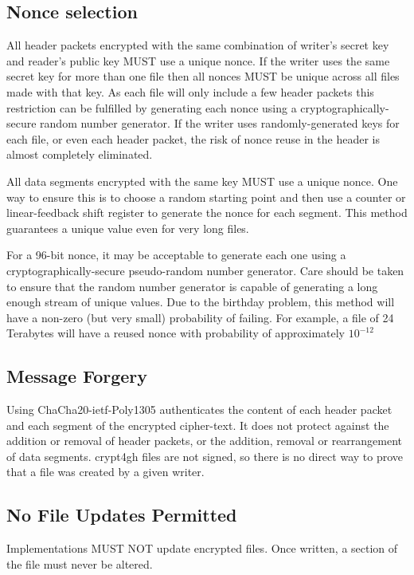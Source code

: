 \documentclass[10pt]{article}
\begin{document}
\subsection{Nonce selection}
All header packets encrypted with the same combination of writer's secret key and reader's public key MUST use a unique
nonce.
If the writer uses the same secret key for more than one file then all nonces MUST be unique across all files made
with that key.
As each file will only include a few header packets this restriction can be fulfilled by generating each nonce
using a cryptographically-secure random number generator.
If the writer uses randomly-generated keys for each file, or even each header packet, the risk of nonce reuse in
the header is almost completely eliminated.

All data segments encrypted with the same key MUST use a unique nonce.
One way to ensure this is to choose a random starting point and then use a counter or linear-feedback shift
register to generate the nonce for each segment.
This method guarantees a unique value even for very long files.

For a 96-bit nonce, it may be acceptable to generate each one using a cryptographically-secure pseudo-random number
generator.
Care should be taken to ensure that the random number generator is capable of generating a long enough stream
of unique values.
Due to the birthday problem, this method will have a non-zero (but very small) probability of failing.
For example, a file of 24 Terabytes will have a reused nonce with probability of approximately $10^{-12}$

\subsection{Message Forgery}
Using ChaCha20-ietf-Poly1305 authenticates the content of each header packet and each segment of the encrypted
cipher-text.
It does not protect against the addition or removal of header packets, or the addition, removal or rearrangement
of data segments.
crypt4gh files are not signed, so there is no direct way to prove that a file was created by a given writer.

\subsection{No File Updates Permitted}
Implementations MUST NOT update encrypted files.
Once written, a section of the file must never be altered.


\end{document}
